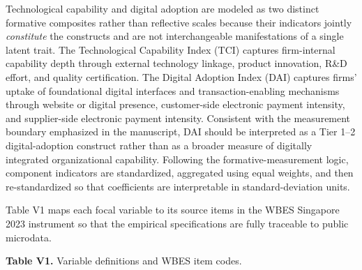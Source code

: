 \documentclass[12pt,a4paper]{article}
\begin{document}
Technological capability and digital adoption are modeled as two
distinct formative composites rather than reflective scales because
their indicators jointly \emph{constitute} the constructs and are not
interchangeable manifestations of a single latent trait. The
Technological Capability Index (TCI) captures firm-internal capability
depth through external technology linkage, product innovation, R\&D
effort, and quality certification. The Digital Adoption Index (DAI)
captures firms' uptake of foundational digital interfaces and
transaction-enabling mechanisms through website or digital presence,
customer-side electronic payment intensity, and supplier-side electronic
payment intensity. Consistent with the measurement boundary emphasized
in the manuscript, DAI should be interpreted as a Tier 1--2
digital-adoption construct rather than as a broader measure of digitally
integrated organizational capability. Following the
formative-measurement logic, component indicators are standardized,
aggregated using equal weights, and then re-standardized so that
coefficients are interpretable in standard-deviation units.

Table V1 maps each focal variable to its source items in the WBES
Singapore 2023 instrument so that the empirical specifications are fully
traceable to public microdata.

\textbf{Table V1.} Variable definitions and WBES item codes.
\end{document}
